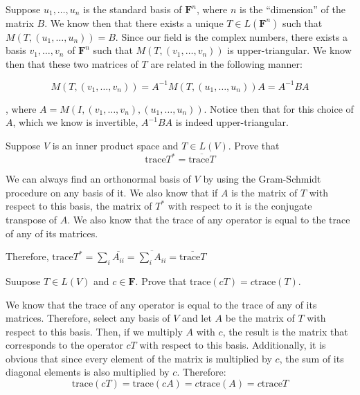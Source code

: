 \begin{solution}

    Suppose $u_1, \ldots, u_n$ is the standard basis of $\mathbf{F}^n$, where $n$ is the ``dimension'' of the matrix $B$. We know then that there exists a unique $T \in L(\mathbf{F}^n)$ such that $M(T, (u_1, \ldots, u_n)) = B$. Since our field is the complex numbers, there exists a basis $v_1, \ldots, v_n$ of $\mathbf{F}^n$ such that $M(T, (v_1, \ldots, v_n))$ is upper-triangular. We know then that these two matrices of $T$ are related in the following manner:
    
    $$M(T, (v_1, \ldots, v_n)) = A^{-1}M(T, (u_1, \ldots, u_n))A = A^{-1}BA$$

    , where $A = M(I, (v_1, \ldots, v_n), (u_1, \ldots, u_n))$. Notice then that for this choice of $A$, which we know is invertible, $A^{-1}BA$ is indeed upper-triangular.
\end{solution}

\begin{exercise}{10}
    Suppose $V$ is an inner product space and $T \in L(V)$. Prove that
    $$\text{trace} T^* = \overline{\text{trace} T}$$
\end{exercise}

\begin{solution}

    We can always find an orthonormal basis of $V$ by using the Gram-Schmidt procedure on any basis of it. We also know that if $A$ is the matrix of $T$ with respect to this basis, the matrix of $T^*$ with respect to it is the conjugate transpose of $A$. We also know that the trace of any operator is equal to the trace of any of its matrices. 
    
    Therefore, $\text{trace} T^* = \sum_i \overline{A_{ii}} = \overline{\sum_i A_{ii}} = \overline{\text{trace} T}$
\end{solution}

\begin{exercise}{14}
    Suupose $T \in L(V)$ and $c \in \mathbf{F}$. Prove that $\text{trace} (cT) = c \text{trace} (T)$.
\end{exercise}

\begin{solution}

    We know that the trace of any operator is equal to the trace of any of its matrices. Therefore, select any basis of $V$ and let $A$ be the matrix of $T$ with respect to this basis. Then, if we multiply $A$ with $c$, the result is the matrix that corresponds to the operator $cT$ with respect to this basis. Additionally, it is obvious that since every element of the matrix is multiplied by $c$, the sum of its diagonal elements is also multiplied by $c$. Therefore:
    $$\text{trace} (cT) = \text{trace} (cA) = c \text{trace} (A) = c \text{trace} T$$
\end{solution}


